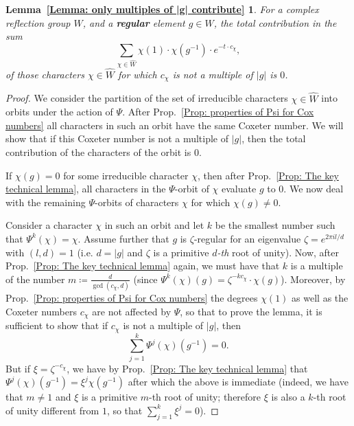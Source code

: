\documentclass[ALCO, Unicode]{cedram}
\newcommand{\op}[1]{\operatorname{#1}}
\newcommand{\op}[1]{\operatorname{#1}}
\begin{document}
\newtheorem*{Lemma: only multiples of |g| contribute}{Lemma~\ref{Lemma: only multiples of |g| contribute}}
\begin{Lemma: only multiples of |g| contribute}
For a complex reflection group $W$, and a \textbf{regular} element $g\in W$, the total contribution in the sum 
\[
\sum_{\chi\in\widehat{W}}\chi(1)\cdot \chi(g^{-1})\cdot e^{-t\cdot c_{\chi}},
\]
of those characters $\chi\in\widehat{W}$ for which $c_{\chi}$ is not a multiple of $|g|$ is $0$.
\end{Lemma: only multiples of |g| contribute}

\begin{proof}
We consider the partition of the set of irreducible characters $\chi\in\widehat{W}$ into orbits under the action of $\Psi$. After Prop.~\ref{Prop: properties of Psi for Cox numbers} all characters in such an orbit have the same Coxeter number. We will show that if this Coxeter number is not a multiple of $|g|$, then the total contribution of the characters of the orbit is $0$. 

If $\chi(g)=0$ for some irreducible character $\chi$, then after Prop.~\ref{Prop: The key technical lemma}, all characters in the $\Psi$-orbit of $\chi$ evaluate $g$ to $0$.  We now deal with the remaining $\Psi$-orbits of characters $\chi$ for which $\chi(g)\neq 0$.

Consider a character $\chi$ in such an orbit and let $k$ be the smallest number such that $\Psi^k(\chi)=\chi$. Assume further that $g$ is $\zeta$-regular for an eigenvalue $\zeta=e^{2\pi il/d}$ with $(l,d)=1$ (i.e. $d=|g|$ and $\zeta$ is a primitive \emph{$d$-th} root of unity). Now, after Prop.~\ref{Prop: The key technical lemma} again, we must have that $k$ is a multiple of the number $m\coloneqq \frac{d}{\op{gcd}(c_{\chi},d)}$ (since $\Psi^k(\chi)(g)=\zeta^{-kc_{\chi}}\cdot\chi(g)$). Moreover, by Prop.~\ref{Prop: properties of Psi for Cox numbers} the degrees $\chi(1)$ as well as the Coxeter numbers $c_{\chi}$ are not affected by $\Psi$, so that to prove the lemma, it is sufficient to show that if $c_{\chi}$ is not a multiple of $|g|$, then $$\sum_{j=1}^k\Psi^j(\chi)(g^{-1})=0.$$ But if $\xi=\zeta^{-c_{\chi}}$, we have by Prop.~\ref{Prop: The key technical lemma} that $\Psi^j(\chi)(g^{-1})=\xi^j\chi(g^{-1})$ after which the above is immediate (indeed, we have that $m\neq 1$ and $\xi$ is a primitive $m$-th root of unity; therefore $\xi$ is
 also a $k$-th root of unity different from $1$, so that $\sum_{j=1}^k\xi^j=0$).
\end{proof}
\end{document}

